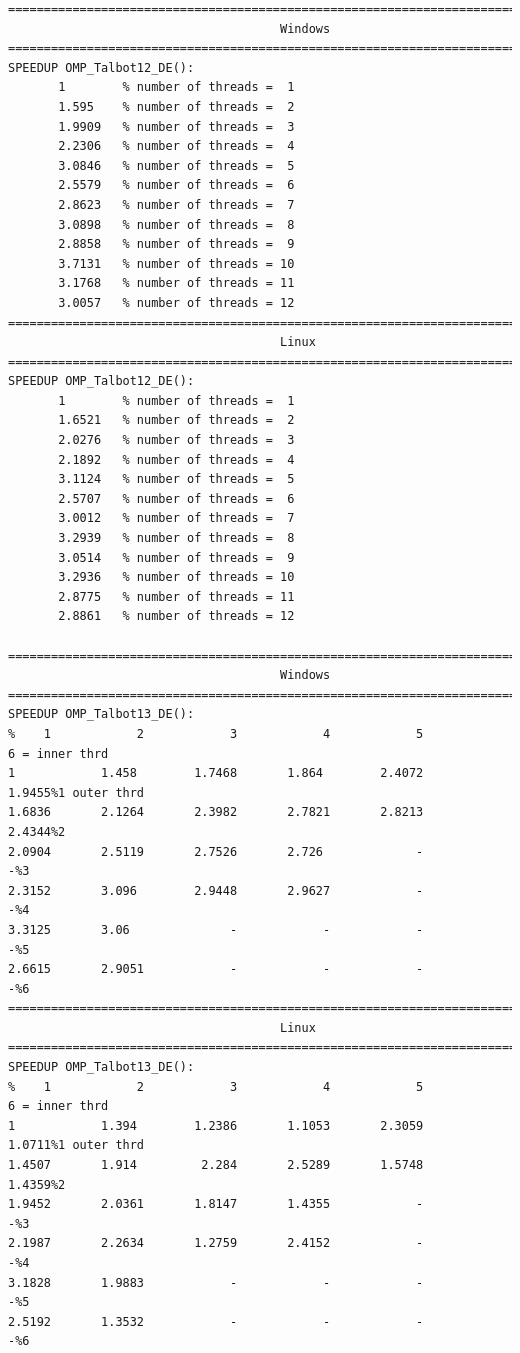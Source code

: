 \documentclass[a4paper,10pt]{report}%
\begin{document}
\begin{lstlisting}
====================================================================================
                                      Windows
====================================================================================
SPEEDUP OMP_Talbot12_DE():
       1        % number of threads =  1
       1.595    % number of threads =  2
       1.9909   % number of threads =  3
       2.2306   % number of threads =  4
       3.0846   % number of threads =  5
       2.5579   % number of threads =  6
       2.8623   % number of threads =  7
       3.0898   % number of threads =  8
       2.8858   % number of threads =  9
       3.7131   % number of threads = 10
       3.1768   % number of threads = 11
       3.0057   % number of threads = 12
====================================================================================
                                      Linux
====================================================================================
SPEEDUP OMP_Talbot12_DE():
       1        % number of threads =  1
       1.6521   % number of threads =  2
       2.0276   % number of threads =  3
       2.1892   % number of threads =  4
       3.1124   % number of threads =  5
       2.5707   % number of threads =  6
       3.0012   % number of threads =  7
       3.2939   % number of threads =  8
       3.0514   % number of threads =  9
       3.2936   % number of threads = 10
       2.8775   % number of threads = 11
       2.8861   % number of threads = 12

====================================================================================
                                      Windows
====================================================================================
SPEEDUP OMP_Talbot13_DE():
%    1            2            3            4            5            6 = inner thrd
1            1.458        1.7468       1.864        2.4072       1.9455%1 outer thrd
1.6836       2.1264       2.3982       2.7821       2.8213       2.4344%2
2.0904       2.5119       2.7526       2.726             -            -%3
2.3152       3.096        2.9448       2.9627            -            -%4
3.3125       3.06              -            -            -            -%5
2.6615       2.9051            -            -            -            -%6
====================================================================================
                                      Linux
====================================================================================
SPEEDUP OMP_Talbot13_DE():
%    1            2            3            4            5            6 = inner thrd
1            1.394        1.2386       1.1053       2.3059       1.0711%1 outer thrd
1.4507       1.914         2.284       2.5289       1.5748       1.4359%2
1.9452       2.0361       1.8147       1.4355            -            -%3
2.1987       2.2634       1.2759       2.4152            -            -%4
3.1828       1.9883            -            -            -            -%5
2.5192       1.3532            -            -            -            -%6
\end{lstlisting}
\end{document}
